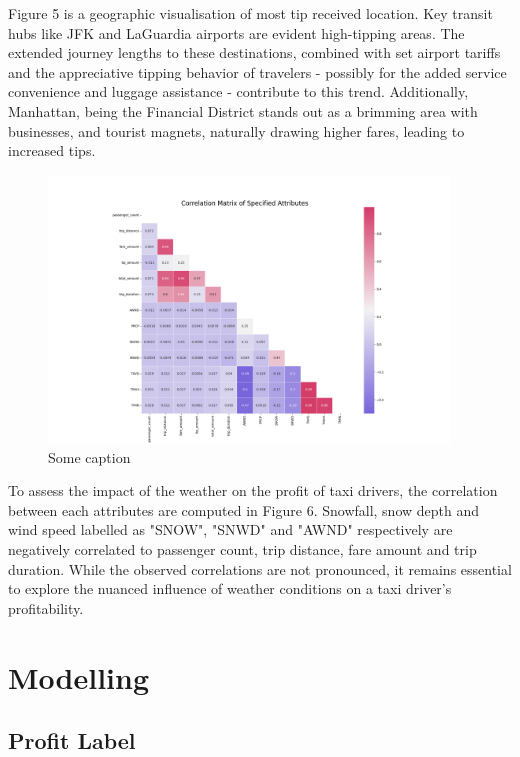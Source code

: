 \documentclass[11pt]{article}
\begin{document}
Figure 5 is a geographic visualisation of most tip received location. Key transit hubs like JFK and LaGuardia airports are evident high-tipping areas. The extended journey lengths to these destinations, combined with set airport tariffs and the appreciative tipping behavior of travelers - possibly for the added service convenience and luggage assistance - contribute to this trend. Additionally, Manhattan, being the Financial District stands out as a brimming area with businesses, and tourist magnets, naturally drawing higher fares, leading to increased tips.


\begin{figure}[H]
    \includegraphics[width=0.95\textwidth]{plots/correlation matrix.png}
    \centering
    \caption{Some caption} %
\end{figure}

To assess the impact of the weather on the profit of taxi drivers, the correlation between each attributes are computed in Figure 6. Snowfall, snow depth and wind speed labelled as "SNOW", "SNWD" and "AWND" respectively are negatively correlated to passenger count, trip distance, fare amount and trip duration. While the observed correlations are not pronounced, it remains essential to explore the nuanced influence of weather conditions on a taxi driver's profitability.

\section{Modelling}
\subsection{Profit Label}
\end{document}
